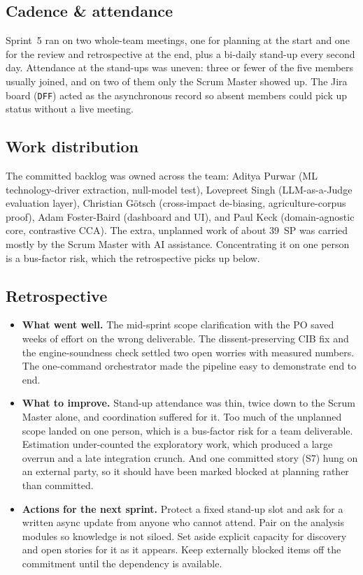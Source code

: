 \documentclass[11pt,a4paper]{article}
\newcommand{\code}[1]{\texttt{\small #1}}
\begin{document}
\subsection*{Cadence \& attendance}
Sprint~5 ran on two whole-team meetings, one for planning at the start and one for the review and
retrospective at the end, plus a bi-daily stand-up every second day. Attendance at the stand-ups was uneven:
three or fewer of the five members usually joined, and on two of them only the Scrum Master showed up. The
Jira board (\code{DFF}) acted as the asynchronous record so absent members could pick up status without a
live meeting.

\subsection*{Work distribution}
The committed backlog was owned across the team: Aditya Purwar (ML technology-driver extraction, null-model
test), Lovepreet Singh (LLM-as-a-Judge evaluation layer), Christian Götsch (cross-impact de-biasing,
agriculture-corpus proof), Adam Foster-Baird (dashboard and UI), and Paul Keck (domain-agnostic core,
contrastive CCA). The extra, unplanned work of about 39~SP was carried mostly by the Scrum Master with AI
assistance. Concentrating it on one person is a bus-factor risk, which the retrospective picks up below.

\subsection*{Retrospective}
\begin{itemize}
  \item \textbf{What went well.} The mid-sprint scope clarification with the PO saved weeks of effort on the
  wrong deliverable. The dissent-preserving CIB fix and the engine-soundness check settled two open worries
  with measured numbers. The one-command orchestrator made the pipeline easy to demonstrate end to end.
  \item \textbf{What to improve.} Stand-up attendance was thin, twice down to the Scrum Master alone, and
  coordination suffered for it. Too much of the unplanned scope landed on one person, which is a bus-factor
  risk for a team deliverable. Estimation under-counted the exploratory work, which produced a large overrun
  and a late integration crunch. And one committed story (S7) hung on an external party, so it should have
  been marked blocked at planning rather than committed.
  \item \textbf{Actions for the next sprint.} Protect a fixed stand-up slot and ask for a written async
  update from anyone who cannot attend. Pair on the analysis modules so knowledge is not siloed. Set aside
  explicit capacity for discovery and open stories for it as it appears. Keep externally blocked items off
  the commitment until the dependency is available.
\end{itemize}
\end{document}
